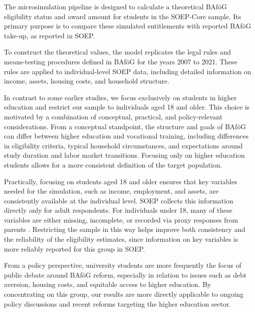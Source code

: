 

The microsimulation pipeline is designed to calculate a theoretical BAföG eligibility status and award amount for students in the SOEP-Core sample. Its primary purpose is to compare these simulated entitlements with reported BAföG take-up, as reported in SOEP.

To construct the theoretical values, the model replicates the legal rules and means-testing procedures defined in BAföG 
\citep{bafoeg_law} for the years 2007 to 2021. 
These rules are applied to individual-level SOEP data, including detailed information on income, assets, housing costs, and household structure.

In contrast to some earlier studies, we focus exclusively on students in higher education and restrict our sample to individuals aged 18 and older. This choice is motivated by a combination of conceptual, practical, and policy-relevant considerations. From a conceptual standpoint, the structure and goals of BAföG can differ between higher education and vocational training, including differences in eligibility criteria, typical household circumstances, and expectations around study duration and labor market transitions. Focusing only on higher education students allows for a more consistent definition of the target population.

Practically, focusing on students aged 18 and older ensures that key variables needed for the simulation, such as income, employment, and assets, are consistently available at the individual level. SOEP collects this information directly only for adult respondents. For individuals under 18, many of these variables are either missing, incomplete, or recorded via proxy responses from parents \citep{soep_pgen_2025, soep_dtc_2005}. Restricting the sample in this way helps improve both consistency and the reliability of the eligibility estimates, since information on key variables is more reliably reported for this group in SOEP. 

From a policy perspective, university students are more frequently the focus of public debate around BAföG reform, especially in relation to issues such as debt aversion, housing costs, and equitable access to higher education. By concentrating on this group, our results are more directly applicable to ongoing policy discussions and recent reforms targeting the higher education sector.

